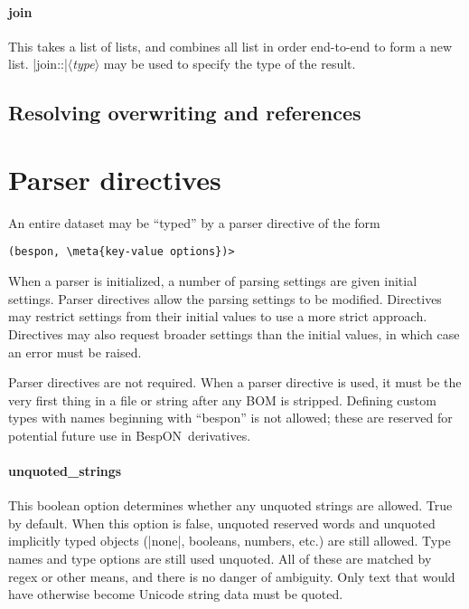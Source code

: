 \documentclass[11pt]{article}
\newcommand{\bespon}{BespON}
\newcommand{\meta}[1]{\ensuremath{\langle}\textit{#1}\ensuremath{\rangle}}
\newcommand{\vmeta}[1]{{\color{DarkRed}\ensuremath{\langle}\textit{#1}\ensuremath{\rangle}}}
\begin{document}
{{\paragraph{join}
This takes a list of lists, and combines all list in order end-to-end to form a new list.  |join::|\vmeta{type} may be used to specify the type of the result.


\subsection{Resolving overwriting and references}






\section{Parser directives}
\label{sec:parser-directive}

An entire dataset may be ``typed'' by a parser directive of the form
\begin{Verbatim}[commandchars=\\\{\}]
(bespon, \meta{key-value options})>
\end{Verbatim}
When a parser is initialized, a number of parsing settings are given initial settings.  Parser directives allow the parsing settings to be modified.  Directives may restrict settings from their initial values to use a more strict approach.  Directives may also request broader settings than the initial values, in which case an error must be raised.

Parser directives are not required.  When a parser directive is used, it must be the very first thing in a file or string after any BOM is stripped.  Defining custom types with names beginning with ``bespon'' is not allowed; these are reserved for potential future use in \bespon\ derivatives.

\paragraph{unquoted\_strings}
This boolean option determines whether any unquoted strings are allowed.  True by default.  When this option is false, unquoted reserved words and unquoted implicitly typed objects (|none|, booleans, numbers, etc.) are still allowed.  Type names and type options are still used unquoted.  All of these are matched by regex or other means, and there is no danger of ambiguity.  Only text that would have otherwise become Unicode string data must be quoted.

}}
\end{document}
